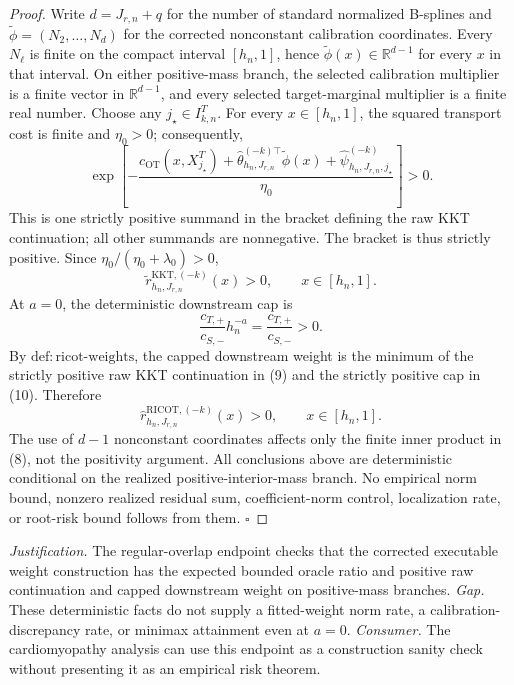 \documentclass{article}
\begin{document}
\begin{proof}
Write \(d=J_{r,n}+q\) for the number of standard normalized B-splines and \(\widetilde\phi=(N_2,\ldots,N_d)\) for the corrected nonconstant calibration coordinates. Every \(N_\ell\) is finite on the compact interval \([h_n,1]\), hence \(\widetilde\phi(x)\in\mathbb R^{d-1}\) for every \(x\) in that interval. On either positive-mass branch, the selected calibration multiplier is a finite vector in \(\mathbb R^{d-1}\), and every selected target-marginal multiplier is a finite real number. Choose any \(j_\star\in I^T_{k,n}\). For every \(x\in[h_n,1]\), the squared transport cost is finite and \(\eta_0>0\); consequently,
\[
\exp\!\left[-\frac{
c_{\mathrm{OT}}(x,X_{j_\star}^T)
+\widehat\theta_{h_n,J_{r,n}}^{(-k)\top}\widetilde\phi(x)
+\widehat\psi^{(-k)}_{h_n,J_{r,n},j_\star}}
{\eta_0}\right]>0.
\tag{8}
\]
This is one strictly positive summand in the bracket defining the raw KKT continuation; all other summands are nonnegative. The bracket is thus strictly positive. Since \(\eta_0/(\eta_0+\lambda_0)>0\),
\[
\widetilde r^{\mathrm{KKT},(-k)}_{h_n,J_{r,n}}(x)>0,
\qquad x\in[h_n,1].
\tag{9}
\]
At \(a=0\), the deterministic downstream cap is
\[
\frac{c_{T,+}}{c_{S,-}}h_n^{-a}
=\frac{c_{T,+}}{c_{S,-}}>0.
\tag{10}
\]
By \(\mathrm{def:ricot\text{-}weights}\), the capped downstream weight is the minimum of the strictly positive raw KKT continuation in (9) and the strictly positive cap in (10). Therefore
\[
\widehat r^{\mathrm{RICOT},(-k)}_{h_n,J_{r,n}}(x)>0,
\qquad x\in[h_n,1].
\tag{11}
\]
The use of \(d-1\) nonconstant coordinates affects only the finite inner product in (8), not the positivity argument. All conclusions above are deterministic conditional on the realized positive-interior-mass branch. No empirical norm bound, nonzero realized residual sum, coefficient-norm control, localization rate, or root-risk bound follows from them. \(\square\)
\end{proof}
\par\smallskip\noindent \textit{Justification.} The regular-overlap endpoint checks that the corrected executable weight construction has the expected bounded oracle ratio and positive raw continuation and capped downstream weight on positive-mass branches. \textit{Gap.} These deterministic facts do not supply a fitted-weight norm rate, a calibration-discrepancy rate, or minimax attainment even at \(a=0\). \textit{Consumer.} The cardiomyopathy analysis can use this endpoint as a construction sanity check without presenting it as an empirical risk theorem.
\end{document}
